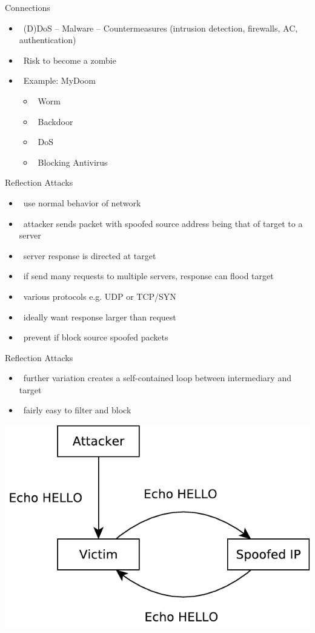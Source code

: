 \documentclass{beamer}
\begin{document}
\begin{frame}{Connections}
  \begin{itemize}
  \item  (D)DoS – Malware – Countermeasures 
    (intrusion detection, firewalls, AC, 
    authentication) 
  \item  Risk to become a zombie 
  \item  Example: MyDoom 
    \begin{itemize}
    \item  Worm 
    \item  Backdoor 
    \item  DoS 
    \item  Blocking Antivirus
    \end{itemize}
  \end{itemize}
\end{frame}


\begin{frame}{Reflection Attacks}
  \begin{itemize}
  \item  use normal behavior of network 
  \item  attacker sends packet with spoofed source 
    address being that of target to a server 
  \item  server response is directed at target 
  \item  if send many requests to multiple servers, 
    response can flood target 
  \item  various protocols e.g. UDP or TCP/SYN 
  \item  ideally want response larger than request 
  \item  prevent if block source spoofed packets
  \end{itemize}
\end{frame}



\begin{frame}{Reflection Attacks }
  \begin{itemize}
  \item  further variation creates a self-contained loop 
    between intermediary and target 
  \item  fairly easy to filter and block
  \end{itemize}
  \begin{center}
  \includegraphics[width=0.6\linewidth]{reflection}
  \end{center}
\end{frame}
\end{document}
